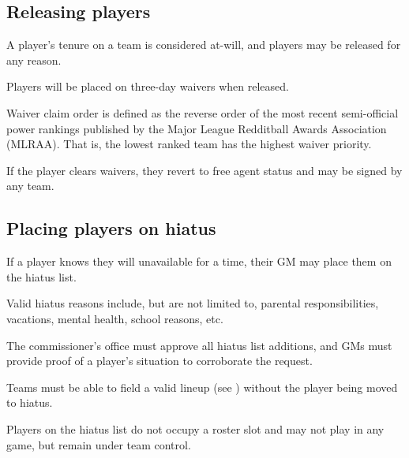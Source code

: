 \subsection{Releasing players}
\begin{deepEnumerate}
	\item A player's tenure on a team is considered at-will, 
	and players may be released for any reason.
	\item Players will be placed on three-day waivers when released.
	\begin{deepEnumerate}
		\item Waiver claim order is defined as the reverse order 
		of the most recent semi-official power rankings 
		published by the Major League Redditball Awards Association (MLRAA).
		That is, the lowest ranked team has the highest waiver priority.
		\item If the player clears waivers, 
		they revert to free agent status and may be signed by any team.
	\end{deepEnumerate}
\end{deepEnumerate}

\subsection{Placing players on hiatus}
\begin{deepEnumerate}
	\item If a player knows they will unavailable for a time,
	their GM may place them on the hiatus list.
	\begin{deepEnumerate}
		\item Valid hiatus reasons include, but are not limited to,
		parental responsibilities, vacations, mental health, school reasons, etc.
		\item The commissioner's office must approve all hiatus list additions,
		and GMs must provide proof of a player's situation to corroborate the request.
		\item Teams must be able to field a valid lineup (see )
		without the player being moved to hiatus.
	\end{deepEnumerate}
	\item Players on the hiatus list do not occupy a roster slot
	and may not play in any game,
	but remain under team control.
\end{deepEnumerate}

